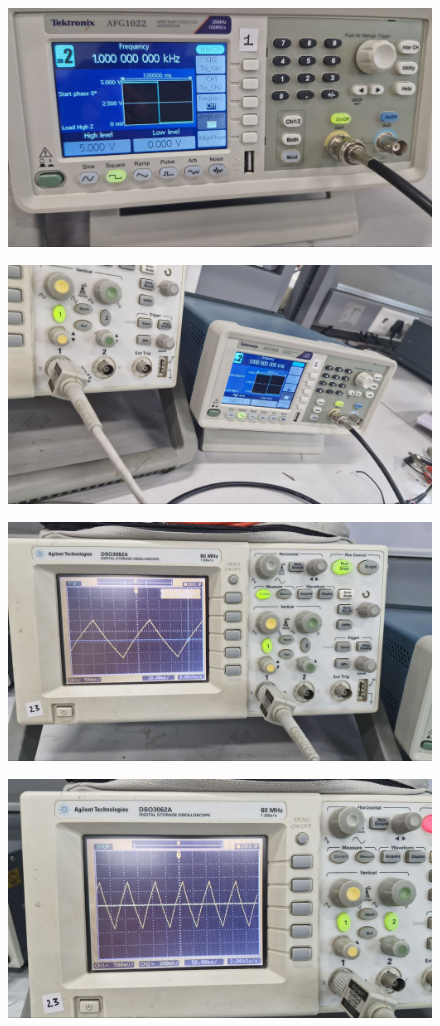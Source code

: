 \documentclass[a4paper,12pt]{article}
\begin{document}
\begin{figure}[h!]
   \centering
   \includegraphics[width=0.7\linewidth]{fig/Figure_1.jpg}
\end{figure}
\begin{figure}[h!]
   \centering
   \includegraphics[width=0.7\linewidth]{fig/Figure_2.jpg}
\end{figure}
\begin{figure}[h!]
   \centering
   \includegraphics[width=0.7\linewidth]{fig/Figure_3.jpg}
\end{figure}
\begin{figure}[h!]
   \centering
   \includegraphics[width=0.7\linewidth]{fig/Figure_4.jpg}
\end{figure}
\end{document}
